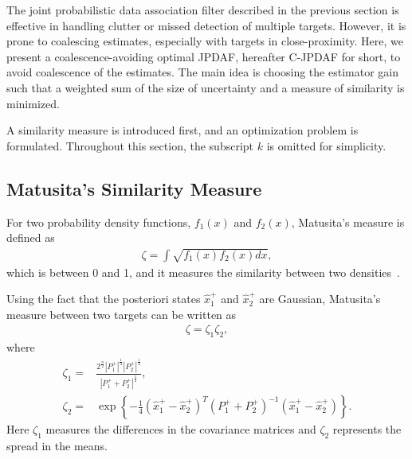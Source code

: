 \documentclass[letterpaper, 10pt, conference]{ieeeconf}
\begin{document}
The joint probabilistic data association filter described in the previous section is effective in handling clutter or missed detection of multiple targets. However, it is prone to coalescing estimates, especially with targets in close-proximity. Here, we present a coalescence-avoiding optimal JPDAF, hereafter C-JPDAF for short, to avoid coalescence of the estimates. The main idea is choosing the estimator gain such that a weighted sum of the size of uncertainty and a measure of similarity is minimized. 

A similarity measure is introduced first, and an optimization problem is formulated. Throughout this section, the subscript $k$ is omitted for simplicity. 







	
\subsection{Matusita's Similarity Measure}

For two probability density functions, $f_1(x)$ and $f_2(x)$, Matusita's measure is defined as
\begin{align*}
\zeta = \int \sqrt{f_1(x)f_2(x) dx},
\end{align*}
which is between 0 and 1, and it measures the similarity between two densities~\cite{Coal_k}. 

Using the fact that the posteriori states $\hat x_1^+$ and $\hat x_2^+$ are Gaussian, Matusita's measure between two targets can be written as
\begin{align}
\zeta=\zeta_1\zeta_2,
\end{align}
where
\begin{align}
\label{Q}
\zeta_1=&\frac{2^\frac{n}{2}|P_1^+|^{\frac{1}{4}}|P_2^+|^{\frac{1}{4}}}{|P_1^++P_2^+|^{\frac{1}{2}}},\\
\label{R}
\zeta_2=&\exp{\left\{-\frac{1}{4}(\hat x^+_1-\hat x^+_2)^T(P_1^++P_2^+)^{-1}(\hat x^+_1-\hat x^+_2)\right\}}.
\end{align}
Here $\zeta_1$ measures the differences in the covariance matrices and $\zeta_2$ represents the spread in the means.
	
\end{document}
